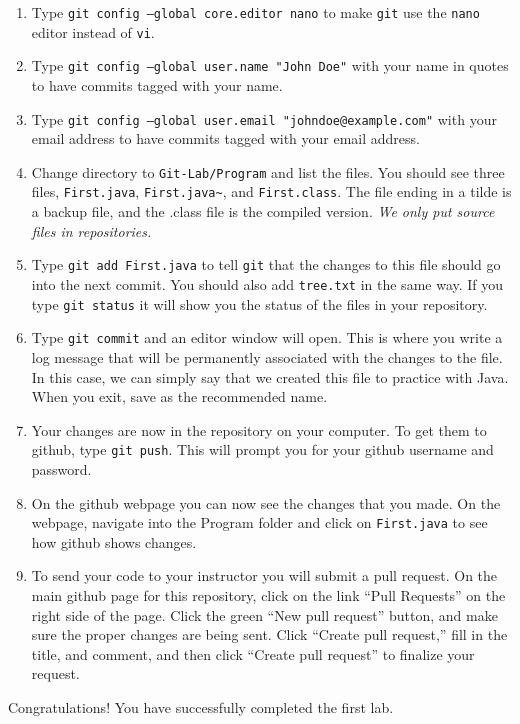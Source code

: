 \documentclass[11pt]{article}
\begin{document}
\begin{enumerate}
\item Type {\tt git config --global core.editor nano} to make {\tt git} use the {\tt nano} editor instead of {\tt vi}.
\item Type {\tt git config --global user.name "John Doe"} with your name in quotes to have commits tagged with your name.
\item Type {\tt git config --global user.email "johndoe@example.com"} with your email address to have commits tagged with your email address.
\item Change directory to {\tt Git-Lab/Program} and list the files.  You should see three files, {\tt First.java}, {\tt First.java\textasciitilde}, and {\tt First.class}.  The file ending in a tilde is a backup file, and the .class file is the compiled version.  {\em We only put source files in repositories.}
\item Type {\tt git add First.java} to tell {\tt git} that the changes to this file should go into the next commit.  You should also add {\tt tree.txt} in the same way.  If you type {\tt git status} it will show you the status of the files in your repository.
\item Type {\tt git commit} and an editor window will open.  This is where you write a log message that will be permanently associated with the changes to the file.  In this case, we can simply say that we created this file to practice with Java.  When you exit, save as the recommended name.
\item Your changes are now in the repository on your computer.  To get them to github, type {\tt git push}.  This will prompt you for your github username and password.
\item On the github webpage you can now see the changes that you made.  On the webpage, navigate into the Program folder and click on {\tt First.java} to see how github shows changes.
\item To send your code to your instructor you will submit a pull request.  On the main github page for this repository, click on the link ``Pull Requests'' on the right side of the page.  Click the green ``New pull request'' button, and make sure the proper changes are being sent.  Click ``Create pull request,'' fill in the title, and comment, and then click ``Create pull request'' to finalize your request.
\end{enumerate}

Congratulations!  You have successfully completed the first lab.
\end{document}
